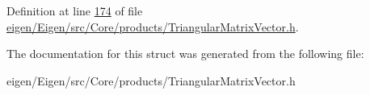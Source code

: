 Definition at line \hyperlink{eigen_2_eigen_2src_2_core_2products_2_triangular_matrix_vector_8h_source_l00174}{174} of file \hyperlink{eigen_2_eigen_2src_2_core_2products_2_triangular_matrix_vector_8h_source}{eigen/\+Eigen/src/\+Core/products/\+Triangular\+Matrix\+Vector.\+h}.



The documentation for this struct was generated from the following file\+:\begin{DoxyCompactItemize}
\item 
eigen/\+Eigen/src/\+Core/products/\+Triangular\+Matrix\+Vector.\+h\end{DoxyCompactItemize}
